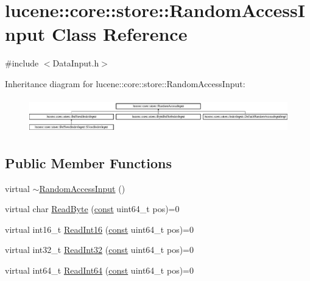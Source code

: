 \hypertarget{classlucene_1_1core_1_1store_1_1RandomAccessInput}{}\section{lucene\+:\+:core\+:\+:store\+:\+:Random\+Access\+Input Class Reference}
\label{classlucene_1_1core_1_1store_1_1RandomAccessInput}


{\ttfamily \#include $<$Data\+Input.\+h$>$}

Inheritance diagram for lucene\+:\+:core\+:\+:store\+:\+:Random\+Access\+Input\+:\begin{figure}[H]
\begin{center}
\leavevmode
\includegraphics[height=1.517615cm]{classlucene_1_1core_1_1store_1_1RandomAccessInput}
\end{center}
\end{figure}
\subsection*{Public Member Functions}
\begin{DoxyCompactItemize}
\item 
virtual \mbox{\hyperlink{classlucene_1_1core_1_1store_1_1RandomAccessInput_a0dd9bbea54ef1573653e64f5cb91361d}{$\sim$\+Random\+Access\+Input}} ()
\item 
virtual char \mbox{\hyperlink{classlucene_1_1core_1_1store_1_1RandomAccessInput_a3fede3f69a074b11632ad0d07c7bf19f}{Read\+Byte}} (\mbox{\hyperlink{ZlibCrc32_8h_a2c212835823e3c54a8ab6d95c652660e}{const}} uint64\+\_\+t pos)=0
\item 
virtual int16\+\_\+t \mbox{\hyperlink{classlucene_1_1core_1_1store_1_1RandomAccessInput_ae2310d2e4250a14c33c3e24d18a13b68}{Read\+Int16}} (\mbox{\hyperlink{ZlibCrc32_8h_a2c212835823e3c54a8ab6d95c652660e}{const}} uint64\+\_\+t pos)=0
\item 
virtual int32\+\_\+t \mbox{\hyperlink{classlucene_1_1core_1_1store_1_1RandomAccessInput_a3deffb5fe76279f2632b9aee859680a8}{Read\+Int32}} (\mbox{\hyperlink{ZlibCrc32_8h_a2c212835823e3c54a8ab6d95c652660e}{const}} uint64\+\_\+t pos)=0
\item 
virtual int64\+\_\+t \mbox{\hyperlink{classlucene_1_1core_1_1store_1_1RandomAccessInput_abb5d56744a927492a2dc0cf0bc8407b3}{Read\+Int64}} (\mbox{\hyperlink{ZlibCrc32_8h_a2c212835823e3c54a8ab6d95c652660e}{const}} uint64\+\_\+t pos)=0
\end{DoxyCompactItemize}


